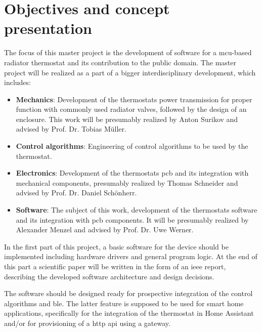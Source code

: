 %
%

\chapter{Objectives and concept presentation}
\label{chap:Objectives and concept presentation}
%
The focus of this master project is the development of software for a \ac{mcu}-based radiator thermostat and its contribution to the public domain. The master project will be realized as a part of a bigger interdisciplinary development, which includes:

\begin{itemize}
	\item \textbf{Mechanics}: Development of the thermostats power transmission for proper function with commonly used radiator valves, followed by the design of an enclosure. This work will be presumably realized by Anton Surikov and advised by Prof. Dr. Tobias Müller.
	\item \textbf{Control algorithms}: Engineering of control algorithms to be used by the thermostat.
	\item \textbf{Electronics}: Development of the thermostats \acs{pcb} and its integration with mechanical components, presumably realized by Thomas Schneider and advised by Prof. Dr. Daniel Schönherr.
	\item \textbf{Software}: The subject of this work, development of the thermostats software and its integration with \acs{pcb} components. It will be presumably realized by Alexander Menzel and advised by Prof. Dr. Uwe Werner.
\end{itemize}

In the first part of this project, a basic software for the device should be implemented including hardware drivers and general program logic. At the end of this part a scientific paper will be written in the form of an \ac{ieee} report, describing the developed software architecture and design decisions.

The software should be designed ready for prospective integration of the control algorithms and \ac{ble}. The latter feature is supposed to be used for smart home applications, specifically for the integration of the thermostat in Home Assistant and/or for provisioning of a \ac{http} \ac{api} using a gateway.

